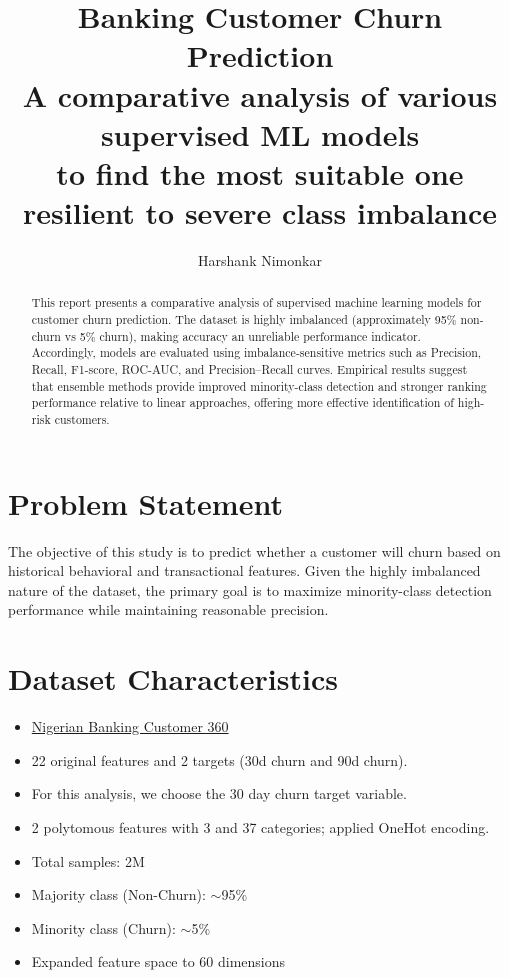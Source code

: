 \documentclass[12pt]{article}
\title{\textbf{Banking Customer Churn Prediction}\\
	\large A comparative analysis of various supervised ML models \\to find the most suitable one resilient to severe class imbalance}
\author{Harshank Nimonkar}
\date{\vspace{-5ex}}
\begin{document}
	
	\maketitle
	
	\begin{abstract}
		\noindent This report presents a comparative analysis of supervised machine learning models for customer churn prediction. The dataset is highly imbalanced (approximately 95\% non-churn vs 5\% churn), making accuracy an unreliable performance indicator. Accordingly, models are evaluated using imbalance-sensitive metrics such as Precision, Recall, F1-score, ROC-AUC, and Precision–Recall curves. Empirical results suggest that ensemble methods provide improved minority-class detection and stronger ranking performance relative to linear approaches, offering more effective identification of high-risk customers.
	\end{abstract}
	
	\section{Problem Statement}
	
	The objective of this study is to predict whether a customer will churn based on historical behavioral and transactional features. 
	Given the highly imbalanced nature of the dataset, the primary goal is to maximize minority-class detection performance while maintaining reasonable precision.
	
	\section{Dataset Characteristics}
	
	\begin{itemize}
		\item \href{https://huggingface.co/datasets/electricsheepafrica/nigerian-banking-customer-360}{Nigerian Banking Customer 360}	
		\item 22 original features and 2 targets (30d churn and 90d churn).
		\item For this analysis, we choose the 30 day churn target variable.
		\item 2 polytomous features with 3 and 37 categories; applied OneHot encoding.
		\item Total samples: 2M
		\item Majority class (Non-Churn): $\sim$95\%
		\item Minority class (Churn): $\sim$5\%
		\item Expanded feature space to 60 dimensions
	\end{itemize}
	
\end{document}
